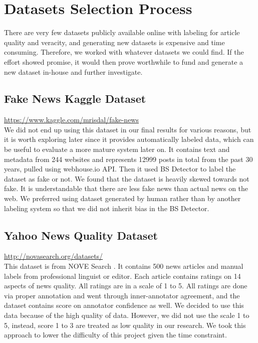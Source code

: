 \documentclass[11pt]{article}
\begin{document}
\section{Datasets Selection Process}

\indent \indent There are very few datasets publicly available online with labeling for article quality and veracity, and generating new datasets is expensive and time consuming.  Therefore, we worked with whatever datasets we could find.  If the effort showed promise, it would then prove worthwhile to fund and generate a new dataset in-house and further investigate.

\subsection{Fake News Kaggle Dataset}
\url{https://www.kaggle.com/mrisdal/fake-news} \\

\indent \indent We did not end up using this dataset in our final results for various reasons, but it is worth exploring later since it provides automatically labeled data, which can be useful to evaluate a more mature system later on. It contains text and metadata from 244 websites and represents 12999 posts in total from the past 30 years, pulled using webhouse.io API. Then it used BS Detector to label the dataset as fake or not. We found that the dataset is heavily skewed towards not fake. It is understandable that there are less fake news than actual news on the web. We preferred using dataset generated by human rather than by another labeling system so that we did not inherit bias in the BS Detector.  

\subsection{Yahoo News Quality Dataset}
\url{http://novasearch.org/datasets/} \\

This dataset is from NOVE Search . It contains 500 news articles and manual labels from professional linguist or editor. Each article contains ratings on 14 aspects of news quality.  All ratings are in a scale of 1 to 5. All ratings are done via proper annotation and went through inner-annotator agreement, and the dataset contains score on annotator confidence as well. We decided to use this data because of the high quality of data. However, we did not use the scale 1 to 5, instead, score 1 to 3 are treated as low quality in our research. We took this approach to lower the difficulty of this project given the time constraint. 
\end{document}
